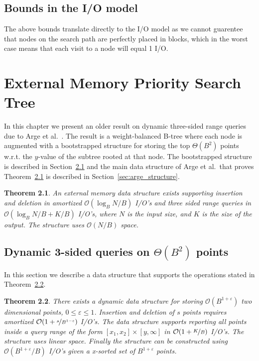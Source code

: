 \documentclass[twoside,11pt,openright]{report}
\def \epsilon {\varepsilon}
\newtheorem{theorem}{Theorem}
\begin{document}
\section{Bounds in the I/O model}
The above bounds translate directly to the I/O model as we cannot guarentee that nodes on the search path are perfectly placed in blocks, which in the worst case means that each visit to a node will equal 1 I/O.

\chapter{External Memory Priority Search Tree}
\label{chp:arge_pst}
In this chapter we present an older result on dynamic three-sided range queries due to Arge et al.~\cite{arge_samoladas_vitter_1999}.
The result is a weight-balanced B-tree where each node is augmented with a bootstrapped structure for storing the top $\Theta(B^2)$ points w.r.t. the $y$-value of the subtree rooted at that node. The bootstrapped structure is described in Section~\ref{sec:child_structure} and the main data structure of Arge et al.~that proves Theorem~\ref{thm:arge_structure} is described in Section~\ref{sec:arge_structure}.

\begin{theorem}
\label{thm:arge_structure}
An external memory data structure exists supporting insertion and deletion in amortized $\mathcal{O}(\log_B N/B)$ I/O's and three sided range queries in $\mathcal{O}(\log_B N/B + K/B)$ I/O's, where $N$ is the input size, and $K$ is the size of the output. The structure uses $\mathcal{O}(N/B)$ space.
\end{theorem}

\section{Dynamic 3-sided queries on $\Theta(B^2)$ points}
\label{sec:child_structure}
In this section we describe a data structure that supports the operations stated in Theorem~\ref{thm:child_structure}.
\begin{theorem}
\label{thm:child_structure}
There exists a dynamic data structure for storing $\mathcal{O}(B^{1+\epsilon})$ two dimensional points, $0 \leq \epsilon \leq 1$.
Insertion and deletion of $s$ points requires amortized $\mathcal{O}(1+\nicefrac{s}{B^{1-\epsilon}})$ I/O's.
The data structure supports reporting all points inside a query range of the form $[x_1,x_2] \times [y,\infty]$ in $\mathcal{O}(1+\nicefrac{K}{B})$ I/O's.
The structure uses linear space.
Finally the structure can be constructed using $\mathcal{O}(B^{1+\epsilon} / B)$ I/O's given a x-sorted set of $B^{1+\epsilon}$ points.
\end{theorem}
\end{document}
